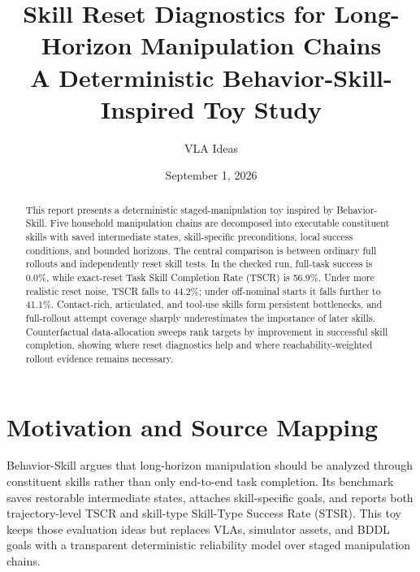 \documentclass[11pt]{article}
\title{Skill Reset Diagnostics for Long-Horizon Manipulation Chains\\\large A Deterministic Behavior-Skill-Inspired Toy Study}
\author{VLA Ideas}
\date{September 1, 2026}
\begin{document}
\maketitle
\begin{abstract}
This report presents a deterministic staged-manipulation toy inspired by Behavior-Skill. Five household manipulation chains are decomposed into executable constituent skills with saved intermediate states, skill-specific preconditions, local success conditions, and bounded horizons. The central comparison is between ordinary full rollouts and independently reset skill tests. In the checked run, full-task success is 0.0\%, while exact-reset Task Skill Completion Rate (TSCR) is 56.9\%. Under more realistic reset noise, TSCR falls to 44.2\%; under off-nominal starts it falls further to 41.1\%. Contact-rich, articulated, and tool-use skills form persistent bottlenecks, and full-rollout attempt coverage sharply underestimates the importance of later skills. Counterfactual data-allocation sweeps rank targets by improvement in successful skill completion, showing where reset diagnostics help and where reachability-weighted rollout evidence remains necessary.
\end{abstract}

\section{Motivation and Source Mapping}
Behavior-Skill argues that long-horizon manipulation should be analyzed through constituent skills rather than only end-to-end task completion. Its benchmark saves restorable intermediate states, attaches skill-specific goals, and reports both trajectory-level TSCR and skill-type Skill-Type Success Rate (STSR). This toy keeps those evaluation ideas but replaces VLAs, simulator assets, and BDDL goals with a transparent deterministic reliability model over staged manipulation chains.
\end{document}
